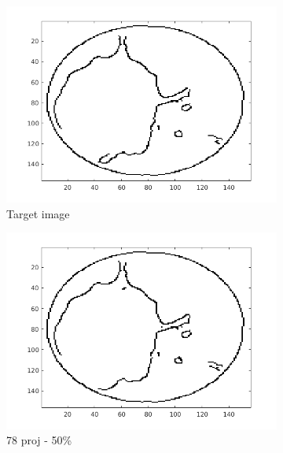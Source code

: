 \documentclass[10pt,a4paper,titlepage]{article}
\begin{document}
\begin{figure}[H]
        	
        	\begin{subfigure}[b]{0.32\textwidth}   
        	    \centering 
            	\includegraphics[width=\textwidth]{Sample1/Edges/target_0_10.png}
            	\caption{Target image}  
        	\end{subfigure}
        	\begin{subfigure}[b]{0.32\textwidth}   
        	    \centering 
        	    \includegraphics[width=\textwidth]{Sample1/Edges/SB/p2_0_10.png}
        	    \caption{78 proj - 50\%}  
        	    \label{subfig:78p1L-D}
       		\end{subfigure}
        	\begin{subfigure}[b]{0.32\textwidth}  

\end{subfigure}
\end{figure}
\end{document}
